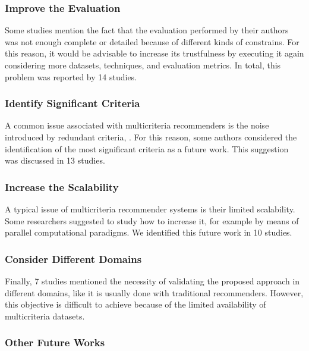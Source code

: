 \subsubsection{Improve the Evaluation}

Some studies mention the fact that the evaluation performed by their authors was not enough complete or detailed because of different kinds of constrains. For this reason, it would be advisable to increase its trustfulness by executing it again considering more datasets, techniques, and evaluation metrics. In total, this problem was reported by 14 studies.

\subsubsection{Identify Significant Criteria}

A common issue associated with multicriteria recommenders is the noise introduced by redundant criteria, . For this reason, some authors considered the identification of the most significant criteria as a future work. This suggestion was discussed in 13 studies.

\subsubsection{Increase the Scalability}

A typical issue of multicriteria recommender systems is their limited scalability.  Some researchers suggested to study how to increase it, for example by means of parallel computational paradigms. We identified this future work in 10 studies.

\subsubsection{Consider Different Domains}

Finally, 7 studies mentioned the necessity of validating the proposed approach in different domains, like it is usually done with traditional recommenders. However, this objective is difficult to achieve because of the limited availability of multicriteria  datasets.

\subsubsection{Other Future Works}

